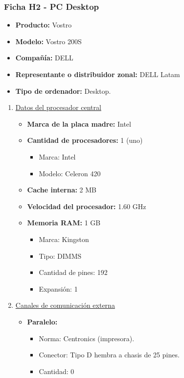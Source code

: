 \subsubsection{Ficha H2 - PC Desktop}
\begin{itemize}
  \item \textbf{Producto:} Vostro
  \item \textbf{Modelo:} Vostro 200S
  \item \textbf{Compañía:} DELL
  \item \textbf{Representante o distribuidor zonal:} DELL Latam
  \item \textbf{Tipo de ordenador:} Desktop.
\end{itemize}

\begin{enumerate}

  \item \underline{Datos del procesador central}
  \begin{itemize}
    \item \textbf{Marca de la placa madre:} Intel
    
    \item \textbf{Cantidad de procesadores:} 1 (uno)
    \begin{itemize}
      \item Marca: Intel
      \item Modelo: Celeron 420
    \end{itemize}
    
    \item \textbf{Cache interna:} 2 MB
    \item \textbf{Velocidad del procesador:} 1.60 GHz
    \item \textbf{Memoria RAM:} 1 GB
    
    \begin{itemize}
      \item Marca: Kingston
      \item Tipo: DIMMS 
      \item Cantidad de pines: 192
      \item Expansión: 1
    \end{itemize}
  \end{itemize}
  
  
  \item \underline{Canales de comunicación externa}
  \begin{itemize}
    \item \textbf{Paralelo:}
    \begin{itemize}
      \item Norma: Centronics (impresora).
      \item Conector: Tipo D hembra a chasis de 25 pines.
      \item Cantidad: 0
    \end{itemize}
    

\end{itemize}
\end{enumerate}

